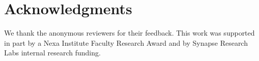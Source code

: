 \section*{Acknowledgments}
{\small We thank the anonymous reviewers for their feedback. This work was supported in part by a Nexa Institute Faculty Research Award and by Synapse Research Labs internal research funding.}



